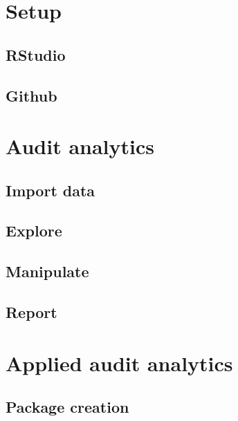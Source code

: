 \documentclass[
]{book}
\begin{document}
\hypertarget{setup}{%
\chapter{Setup}\label{setup}}

\hypertarget{rstudio}{%
\section{RStudio}\label{rstudio}}

\hypertarget{github}{%
\section{Github}\label{github}}

\hypertarget{audit-analytics}{%
\chapter{Audit analytics}\label{audit-analytics}}

\hypertarget{import-data}{%
\section{Import data}\label{import-data}}

\hypertarget{explore}{%
\section{Explore}\label{explore}}

\hypertarget{manipulate}{%
\section{Manipulate}\label{manipulate}}

\hypertarget{report}{%
\section{Report}\label{report}}

\hypertarget{applied-audit-analytics}{%
\chapter{Applied audit analytics}\label{applied-audit-analytics}}

\hypertarget{package-creation}{%
\section{Package creation}\label{package-creation}}
\end{document}
